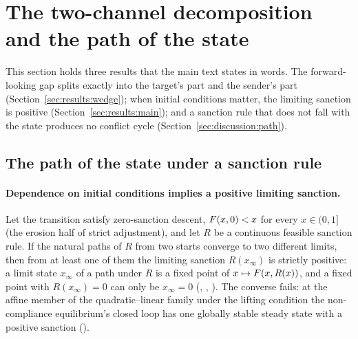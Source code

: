 \section{The two-channel decomposition and the path of the state}
\label{app:decomposition-path}

This section holds three results that the main text states in words. The forward-looking
gap splits exactly into the target's part and the sender's part
(Section~\ref{sec:results:wedge}); when initial conditions matter, the limiting sanction is
positive (Section~\ref{sec:results:main}); and a sanction rule that does not fall with the
state produces no conflict cycle (Section~\ref{sec:discussion:path}).

\subsection{The path of the state under a sanction rule}
\label{app:state-path}

\paragraph{Dependence on initial conditions implies a positive limiting sanction.}
\begin{proposition}
\label{prop:limit-dependence}
Let the transition satisfy zero-sanction descent, $F(x,0)<x$ for every
$x\in(0,1]$ (the erosion half of strict adjustment), and let $R$ be a
continuous feasible sanction rule. If the natural paths of $R$ from two
starts converge to two different limits, then from at least one of them the
limiting sanction $R(x_\infty)$ is strictly positive: a limit state $x_\infty$
of a path under $R$ is a fixed point of $x\mapsto F(x,R(x))$, and a fixed point
with $R(x_\infty)=0$ can only be $x_\infty=0$
(, ,
). The converse fails: at the affine
member of the quadratic--linear family under the lifting condition the non-compliance equilibrium's closed loop has one
globally stable steady state with a positive sanction
().
\end{proposition}

